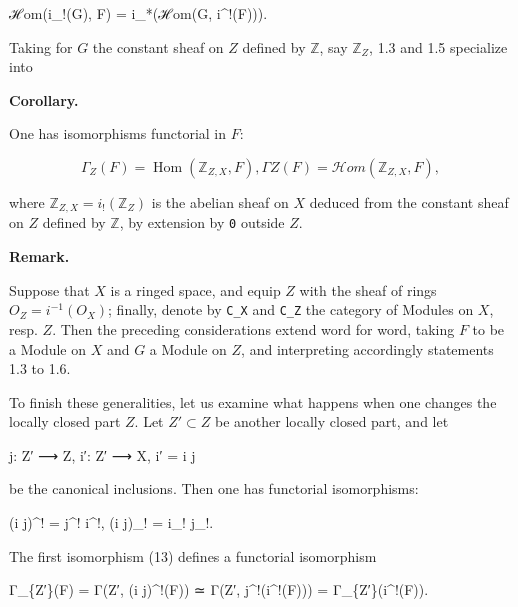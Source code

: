 \documentclass[
  11pt,
  a4paper,
]{book}
\newenvironment{Shaded}{}{}
\newcommand{\NormalTok}[1]{#1}
\begin{document}
\begin{Shaded}
\begin{Highlighting}[]
\NormalTok{ℋom(i\_!(G), F) = i\_*(ℋom(G, i\^{}!(F))).}
\end{Highlighting}
\end{Shaded}

Taking for \(G\) the constant sheaf on \(Z\) defined by \(\mathbb{Z}\),
say \(\mathbb{Z}_{Z}\), 1.3 and 1.5 specialize into

\textbf{Corollary.}

One has isomorphisms functorial in \(F\):

\[ \Gamma_{Z}(F) = \operatorname{Hom}(\mathbb{Z}_{Z,X}, F), \Gamma Z(F) = \mathcal{H}om(\mathbb{Z}_{Z,X}, F), \]

where \(\mathbb{Z}_{Z,X} = i_{!}(\mathbb{Z}_{Z})\) is the abelian sheaf
on \(X\) deduced from the constant sheaf on \(Z\) defined by
\(\mathbb{Z}\), by extension by \texttt{0} outside \(Z\).

\textbf{Remark.}

Suppose that \(X\) is a ringed space, and equip \(Z\) with the sheaf of
rings \(O_{Z} = i^{-1}(O_{X})\); finally, denote by \texttt{C\_X} and
\texttt{C\_Z} the category of Modules on \(X\), resp. \(Z\). Then the
preceding considerations extend word for word, taking \(F\) to be a
Module on \(X\) and \(G\) a Module on \(Z\), and interpreting
accordingly statements 1.3 to 1.6.

To finish these generalities, let us examine what happens when one
changes the locally closed part \(Z\). Let \(Z' \subset
Z\) be another locally closed part, and let

\begin{Shaded}
\begin{Highlighting}[]
\NormalTok{j: Z′ ⟶ Z,   i′: Z′ ⟶ X,   i′ = i j}
\end{Highlighting}
\end{Shaded}

be the canonical inclusions. Then one has functorial isomorphisms:

\begin{Shaded}
\begin{Highlighting}[]
\NormalTok{(i j)\^{}! = j\^{}! i\^{}!,   (i j)\_! = i\_! j\_!.}
\end{Highlighting}
\end{Shaded}

The first isomorphism (13) defines a functorial isomorphism

\begin{Shaded}
\begin{Highlighting}[]
\NormalTok{Γ\_\{Z′\}(F) = Γ(Z′, (i j)\^{}!(F)) ≃ Γ(Z′, j\^{}!(i\^{}!(F))) = Γ\_\{Z′\}(i\^{}!(F)).}
\end{Highlighting}
\end{Shaded}
\end{document}
